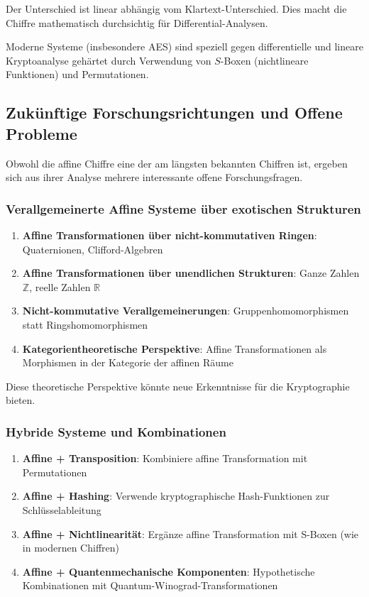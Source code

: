 ﻿\documentclass[12pt,a4paper]{article}
\begin{document}
	Der Unterschied ist linear abhängig vom Klartext-Unterschied. Dies macht die Chiffre mathematisch durchsichtig für Differential-Analysen.
	
	Moderne Systeme (insbesondere AES) sind speziell gegen differentielle und lineare Kryptoanalyse gehärtet durch Verwendung von $S$-Boxen (nichtlineare Funktionen) und Permutationen.
	
	
	\subsection{Zukünftige Forschungsrichtungen und Offene Probleme}
	
	Obwohl die affine Chiffre eine der am längsten bekannten Chiffren ist, ergeben sich aus ihrer Analyse mehrere interessante offene Forschungsfragen.
	
	\subsubsection{Verallgemeinerte Affine Systeme über exotischen Strukturen}
	
	\begin{enumerate}
		\item \textbf{Affine Transformationen über nicht-kommutativen Ringen}: Quaternionen, Clifford-Algebren
		\item \textbf{Affine Transformationen über unendlichen Strukturen}: Ganze Zahlen $\mathbb{Z}$, reelle Zahlen $\mathbb{R}$
		\item \textbf{Nicht-kommutative Verallgemeinerungen}: Gruppenhomomorphismen statt Ringshomomorphismen
		\item \textbf{Kategorientheoretische Perspektive}: Affine Transformationen als Morphismen in der Kategorie der affinen Räume
	\end{enumerate}
	
	Diese theoretische Perspektive könnte neue Erkenntnisse für die Kryptographie bieten.
	
	\subsubsection{Hybride Systeme und Kombinationen}
	
	\begin{enumerate}
		\item \textbf{Affine + Transposition}: Kombiniere affine Transformation mit Permutationen
		\item \textbf{Affine + Hashing}: Verwende kryptographische Hash-Funktionen zur Schlüsselablei\-tung
		\item \textbf{Affine + Nichtlinearität}: Ergänze affine Transformation mit S-Boxen (wie in modernen Chiffren)
		\item \textbf{Affine + Quantenmechanische Komponenten}: Hypothetische Kombinationen mit Quantum-Winograd-Transformationen
	\end{enumerate}
	
\end{document}
